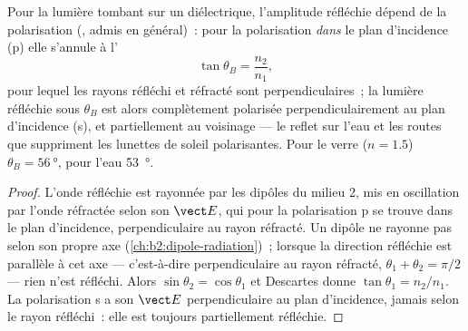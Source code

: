 \begin{proposition}\label{prop:b2:wave-interfaces:brewster}
Pour la lumière tombant sur un diélectrique, l'amplitude réfléchie dépend de
la polarisation (, admis en général)~: pour la
polarisation \emph{dans} le plan d'incidence (p) elle s'annule à
l'\emph{}
\[
\tan\theta_B = \frac{n_2}{n_1} ,
\]
pour lequel les rayons réfléchi et réfracté sont perpendiculaires~; la lumière
réfléchie sous $\theta_B$ est alors complètement polarisée perpendiculairement au
plan d'incidence (s), et partiellement au voisinage --- le reflet sur
l'eau et les routes que suppriment les lunettes de soleil polarisantes. Pour le verre ($n = 1.5$)
$\theta_B = \qty{56}{\degree}$, pour l'eau \qty{53}{\degree}.
\end{proposition}

\begin{proof}
L'onde réfléchie est rayonnée par les dipôles du milieu 2, mis
en oscillation par l'onde réfractée selon son $\vect E$, qui pour la
polarisation p se trouve dans le plan d'incidence, perpendiculaire au
rayon réfracté. Un dipôle ne rayonne pas selon son propre axe
(\cref{ch:b2:dipole-radiation})~; lorsque la direction réfléchie est
parallèle à cet axe --- c'est-à-dire perpendiculaire au rayon réfracté, $\theta_1
+ \theta_2 = \pi/2$ --- rien n'est réfléchi. Alors $\sin\theta_2 = \cos\theta_1$ et
Descartes donne $\tan\theta_1 = n_2/n_1$. La polarisation s a son $\vect E$
perpendiculaire au plan d'incidence, jamais selon le rayon
réfléchi~: elle est toujours partiellement réfléchie.
\end{proof}

